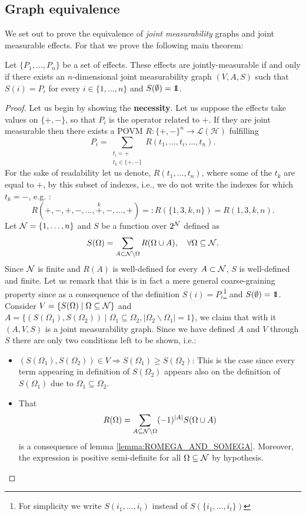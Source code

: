 \documentclass[10pt, a4paper]{amsart}
\begin{document}
\newpage
\subsection{Graph equivalence}
We set out to prove the equivalence of \emph{joint measurability} graphs and joint measurable effects. For that we prove the following main theorem: 
\begin{theorem}\label{Theorem:EQUIVALENCE}
Let
 $\{P_{1}, \ldots , P_{n}\}$ be a set of effects. These effects are jointly-measurable if and only if there exists an $n$-dimensional joint measurability graph $(V, A, S)$ such that $S(i) = P_{i}$ for every $i\in  \{ 1,\ldots , n \}$ and \emph{$S(\emptyset ) = \bbone$}. 
\end{theorem}
\begin{proof}

Let us begin by showing the \textbf{necessity}. Let us suppose the effects take values on $\{+,-\}$, so that $P_{i}$ is the operator related to $+$. If they are joint measurable then there exists a POVM $R: \{+,-\}^{n}\to \mathcal{L}(\mathcal{H})$ fulfilling 
$$
P_{i} = \sum_{\substack{ t_{i} = +\\ t_{k} \in \{+,-\} }} R (t_{1}, \ldots, t_{i}, \ldots , t_{n}) .
$$
For the sake of readability let us denote, $R(t_{1}, \ldots , t_{n} ) $, where  some of the $t_{k}$ are equal to $+$, by this subset of indexes, i.e., we do not write the indexes for which $t_{k} = -$, e.g. :
$$
R(+, - , +, - , \ldots, \overset{k}{+}, - , \ldots , +) =: R(\{1,3,k,n\}) = R(1,3,k,n).
$$ 
Let $\mathcal{N} = \{1, \ldots , n\}$ and $S$ be a function over $2^{\mathcal{N}} $ defined as 
$$
S( \Omega )  = \sum_{A\subset \mathcal{N}\backslash \Omega} R(\Omega \cup A), \quad \forall \Omega \subseteq \mathcal{N}. 
$$
Since $\mathcal{N} $ is finite and $R ( A ) $ is well-defined for every $A \subset \mathcal{N}$, $S$ is well-defined and finite. Let us remark that this is in fact a mere general coarse-graining property since as a consequence of the definition $S(i) = P_{i}$\footnote{For simplicity we write $S(i_{1}, \ldots , i_{t})$ instead of $S(\{i_{1}, \ldots , i_{t}\})$} and $S(\emptyset ) = \bbone$. Consider 
$V = \{ S(\Omega) \mid \Omega \subseteq \mathcal{N} \}$ 
and 
$A = \{ (S(\Omega_{1}), S(\Omega_{2}))\mid \Omega_{1}\subseteq \Omega_{2}, |\Omega_{2}\backslash \Omega_{1}| = 1 \}$, 
we claim that with it $(A,V,S)$ is a joint measurability graph. Since we have defined $A$ and $V$ through $S$ there are only two conditions left to be shown, i.e.:
\begin{itemize}
\item $(S(\Omega_{1} ) , S(\Omega_{2}))\in V  \Rightarrow S(\Omega_{1} ) \geq S(\Omega_{2}) $: This is the case since every term appearing in definition of $S(\Omega_{2} ) $ appears also on the definition of $S(\Omega_{1})$ due to $\Omega_{1} \subseteq \Omega_{2} $. 
\item That 
$$
R(\Omega)=\sum_{A\subseteq \mathcal{N}\backslash \Omega } (-1)^{|A|}S(\Omega \cup A)
$$
is a consequence of lemma \ref{lemma:ROMEGA_AND_SOMEGA}. Moreover, the expression is positive semi-definite for all $\Omega \subseteq \mathcal{N}$ by hypothesis. 
\end{itemize}


\end{proof}
\end{document}
